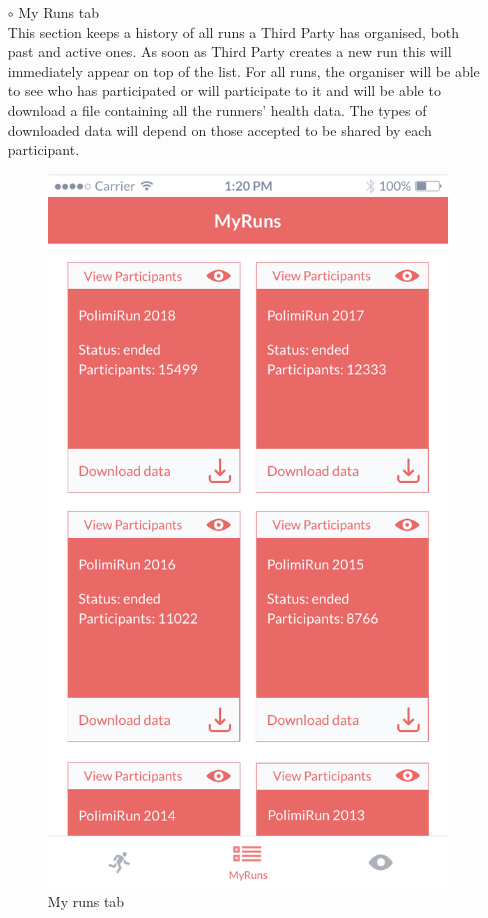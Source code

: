 \documentclass[titlepage]{article}
\begin{document}
\begin{itemize}
\begin{itemize}
\begin{itemize}
					\item[$\circ$] My Runs tab \\
					This section keeps a history of all runs a Third Party has organised, both past and active ones. As soon as Third Party creates a new run this will immediately appear on top of the list. For all runs, the organiser will be able to see who has participated or will participate to it and will be able to download a file containing all the runners’ health data. The types of downloaded data will depend on those accepted to be shared by each participant. \\
					\begin{figure}[H]
						\center
  						\includegraphics[width=0.5\columnwidth]{Mockup/mockupMyRuns.png}
  						\caption{My runs tab}
 					 	\label{fig:MyRuns}
					\end{figure}


\end{itemize}
\end{itemize}
\end{itemize}
\end{document}
